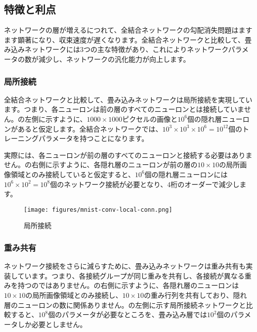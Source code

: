 \begin{content}
\begin{content}

\subsection{特徴と利点}

ネットワークの層が増えるにつれて、全結合ネットワークの勾配消失問題はますます顕著になり、収束速度が遅くなります。全結合ネットワークと比較して、畳み込みネットワークには3つの主な特徴があり、これによりネットワークパラメータの数が減少し、ネットワークの汎化能力が向上します。

\subsubsection{局所接続}

全結合ネットワークと比較して、畳み込みネットワークは局所接続を実現しています。つまり、各ニューロンは前の層のすべてのニューロンとは接続していません。の左側に示すように、$ 1000 \times 1000 $ピクセルの画像と$ 10^6 $個の隠れ層ニューロンがあると仮定します。全結合ネットワークでは、$ 10^3 \times 10^3 \times 10^6 = 10^{12} $個のトレーニングパラメータを持つことになります。

実際には、各ニューロンが前の層のすべてのニューロンと接続する必要はありません。の右側に示すように、各隠れ層のニューロンが前の層の$ 10 \times 10 $の局所画像領域とのみ接続していると仮定すると、$ 10^6 $個の隠れ層ニューロンには$ 10^6 \times 10^2 = 10^8$個のネットワーク接続が必要となり、4桁のオーダーで減少します。

\begin{figure}[H]
\centering
\texttt{[image: figures/mnist-conv-local-conn.png]}
\caption{局所接続}
 \label{fig:mnist-conv-local-conn}
\end{figure}

\subsubsection{重み共有}

ネットワーク接続をさらに減らすために、畳み込みネットワークは重み共有も実装しています。つまり、各接続グループが同じ重みを共有し、各接続が異なる重みを持つのではありません。の右側に示すように、各隠れ層のニューロンは$ 10 \times 10 $の局所画像領域とのみ接続し、$ 10 \times 10 $の重み行列を共有しており、隠れ層のニューロンの数に関係ありません。の左側に示す局所接続ネットワークと比較すると、$10^8$個のパラメータが必要なところを、畳み込み層では$10^2$個のパラメータしか必要としません。


\end{content}
\end{content}
